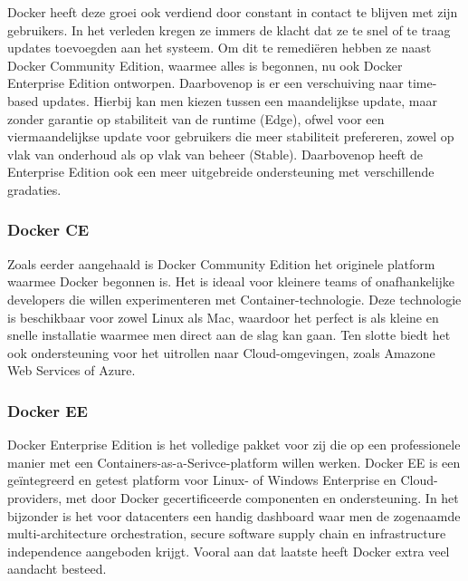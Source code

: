 \autocite{Cloud2017}

Docker heeft deze groei ook verdiend door constant in contact te blijven met zijn gebruikers. In het verleden kregen ze immers de klacht dat ze te snel of te traag updates toevoegden aan het systeem. Om dit te remediëren hebben ze naast Docker Community Edition, waarmee alles is begonnen, nu ook Docker Enterprise Edition ontworpen. Daarbovenop is er een verschuiving naar time-based updates. Hierbij kan men kiezen tussen een maandelijkse update, maar zonder garantie op stabiliteit van de runtime (Edge), ofwel voor een viermaandelijkse update voor gebruikers die meer stabiliteit prefereren, zowel op vlak van onderhoud als op vlak van beheer (Stable). Daarbovenop heeft de Enterprise Edition ook een meer uitgebreide ondersteuning met verschillende gradaties. \autocite{Ramandeep2018}

\subsubsection{Docker CE}
Zoals eerder aangehaald is Docker Community Edition het originele platform waarmee Docker begonnen is. Het is ideaal voor kleinere teams of onafhankelijke developers die willen experimenteren met Container-technologie. Deze technologie is beschikbaar voor zowel Linux als Mac, waardoor het perfect is als kleine en snelle installatie waarmee men direct aan de slag kan gaan. Ten slotte biedt het ook ondersteuning voor het uitrollen naar Cloud-omgevingen, zoals Amazone Web Services of Azure. \autocite{Nick2017}

\subsubsection{Docker EE}
Docker Enterprise Edition is het volledige pakket voor zij die op een professionele manier met een Containers-as-a-Serivce-platform willen werken. Docker EE is een geïntegreerd en getest platform voor Linux- of Windows Enterprise en Cloud-providers, met door Docker gecertificeerde componenten en ondersteuning. In het bijzonder is het voor datacenters een handig dashboard waar men de zogenaamde multi-architecture orchestration, secure software supply chain en infrastructure independence aangeboden krijgt. Vooral aan dat laatste heeft Docker extra veel aandacht besteed. \autocite{Vivek2018}

